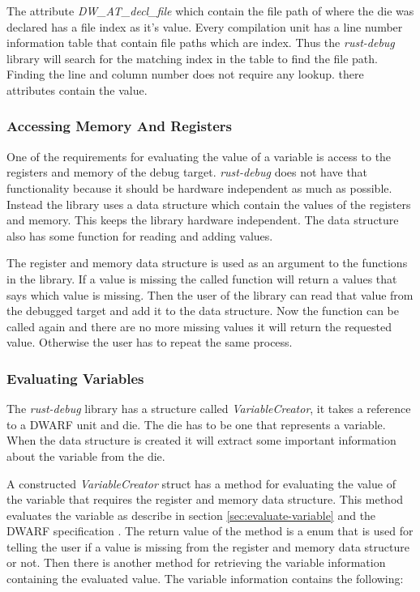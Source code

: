 The attribute  \emph{DW\_AT\_decl\_file} which contain the file path of where the \gls{die} was declared has a file index as it's value.
Every compilation unit has a line number information table that contain file paths which are index.
Thus the \emph{rust-debug} library will search for the matching index in the table to find the file path.
Finding the line and column number does not require any lookup. there attributes contain the value.


\subsubsection{Accessing Memory And Registers}
One of the requirements for evaluating the value of a variable is access to the registers and memory of the debug target.
\emph{rust-debug} does not have that functionality because it should be hardware independent as much as possible.
Instead the library uses a data structure which contain the values of the registers and memory.
This keeps the library hardware independent.
The data structure also has some function for reading and adding values.


The register and memory data structure is used as an argument to the functions in the library.
If a value is missing the called function will return a values that says which value is missing.
Then the user of the library can read that value from the debugged target and add it to the data structure.
Now the function can be called again and there are no more missing values it will return the requested value.
Otherwise the user has to repeat the same process.


\subsubsection{Evaluating Variables} \label{sec:ievalvar}
The \emph{rust-debug} library has a structure called \emph{VariableCreator}, it takes a reference to a \gls{DWARF} unit and \gls{die}.
The \gls{die} has to be one that represents a variable.
When the data structure is created it will extract some important information about the variable from the \gls{die}.


A constructed \emph{VariableCreator} struct has a method for evaluating the value of the variable that requires the register and memory data structure.
This method evaluates the variable as describe in section \ref{sec:evaluate-variable} and the \gls{DWARF} specification \cite{dwarf}.
The return value of the method is a enum that is used for telling the user if a value is missing from the register and memory data structure or not.
Then there is another method for retrieving the variable information containing the evaluated value.
The variable information contains the following:

